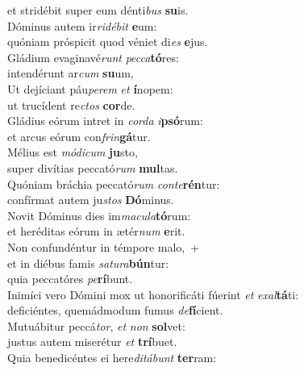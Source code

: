\evenverse et stridébit super eum dénti\textit{bus} \textbf{su}is.\\
\oddverse Dóminus autem ir\textit{ri}\textit{dé}\textit{bit} \textbf{e}um:~\*\\
\oddverse quóniam próspicit quod véniet di\textit{es} \textbf{e}jus.\\
\evenverse Gládium evaginavé\textit{runt} \textit{pec}\textit{ca}\textbf{tó}res:~\*\\
\evenverse intendérunt ar\textit{cum} \textbf{su}um,\\
\oddverse Ut dejíciant páu\textit{pe}\textit{rem} \textit{et} \textbf{í}nopem:~\*\\
\oddverse ut trucídent re\textit{ctos} \textbf{cor}de.\\
\evenverse Gládius eórum intret in \textit{cor}\textit{da} \textit{i}\textbf{psó}rum:~\*\\
\evenverse et arcus eórum con\textit{frin}\textbf{gá}tur.\\
\oddverse Mélius est \textit{mó}\textit{di}\textit{cum} \textbf{ju}sto,~\*\\
\oddverse super divítias peccató\textit{rum} \textbf{mul}tas.\\
\evenverse Quóniam bráchia peccató\textit{rum} \textit{con}\textit{te}\textbf{rén}tur:~\*\\
\evenverse confírmat autem ju\textit{stos} \textbf{Dó}minus.\\
\oddverse Novit Dóminus dies im\textit{ma}\textit{cu}\textit{la}\textbf{tó}rum:~\*\\
\oddverse et heréditas eórum in ætér\textit{num} \textbf{e}rit.\\
\evenverse Non confundéntur in témpore malo,~+\\
\evenverse  et in diébus famis \textit{sa}\textit{tu}\textit{ra}\textbf{bún}tur:~\*\\
\evenverse quia peccatóres \textit{pe}\textbf{rí}bunt.\\
\oddverse Inimíci vero Dómini mox ut honorificáti fúerint \textit{et} \textit{e}\textit{xal}\textbf{tá}ti:~\*\\
\oddverse deficiéntes, quemádmodum fumus \textit{de}\textbf{fí}cient.\\
\evenverse Mutuábitur peccá\textit{tor}, \textit{et} \textit{non} \textbf{sol}vet:~\*\\
\evenverse justus autem miserétur \textit{et} \textbf{trí}buet.\\
\oddverse Quia benedicéntes ei here\textit{di}\textit{tá}\textit{bunt} \textbf{ter}ram:~\*\\
